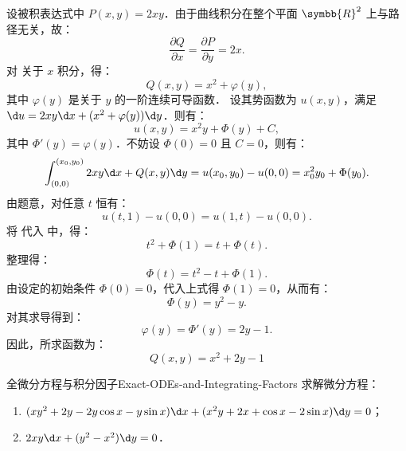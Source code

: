 \begin{solution}
    设被积表达式中 $P(x,y) = 2xy$．由于曲线积分在整个平面 $\symbb{R}^2$ 上与路径无关，故：
    \begin{equation}
        \label{eq:p11-exact}
        \frac{\partial Q}{\partial x} = \frac{\partial P}{\partial y} = 2x.
    \end{equation}
    对  关于 $x$ 积分，得：
    \begin{equation}
        Q(x,y) = x^2 + \varphi(y),
    \end{equation}
    其中 $\varphi(y)$ 是关于 $y$ 的一阶连续可导函数．
    设其势函数为 $u(x,y)$，满足 $\d u = 2xy \d x + (x^2 + \varphi(y)) \d y$．则有：
    \begin{equation}
        u(x,y) = x^2 y + \Phi(y) + C,
    \end{equation}
    其中 $\Phi'(y) = \varphi(y)$．不妨设 $\Phi(0) = 0$ 且 $C = 0$，则有：
    \begin{equation}
        \label{eq:p11-potential}
        \int_{(0,0)}^ {(x_0, y_0)} 2xy \d x + Q(x,y) \d y = u(x_0, y_0) - u(0,0) = x_0^2 y_0 + \Phi(y_0).
    \end{equation}
    由题意，对任意 $t$ 恒有：
    \begin{equation}
        \label{eq:p11-identity}
        u(t, 1) - u(0,0) = u(1, t) - u(0,0).
    \end{equation}
    将  代入  中，得：
    \begin{equation}
        t^2 + \Phi(1) = t + \Phi(t).
    \end{equation}
    整理得：
    \begin{equation}
        \Phi(t) = t^2 - t + \Phi(1).
    \end{equation}
    由设定的初始条件 $\Phi(0) = 0$，代入上式得 $\Phi(1) = 0$，从而有：
    \begin{equation}
        \Phi(y) = y^2 - y.
    \end{equation}
    对其求导得到：
    \begin{equation}
        \varphi(y) = \Phi'(y) = 2y - 1.
    \end{equation}
    因此，所求函数为：
    \begin{equation}
        \boxed{Q(x,y) = x^2 + 2y - 1}
    \end{equation}
\end{solution}

\begin{problem}{全微分方程与积分因子}{Exact-ODEs-and-Integrating-Factors}
    求解微分方程：
    \begin{enumerate}
        \item $(xy^2 + 2y - 2y \cos x - y \sin x) \d x + (x^2y + 2x + \cos x - 2 \sin x) \d y = 0$；
        \item $2xy \d x + (y^2 - x^2) \d y = 0$．
    \end{enumerate}
\end{problem}

